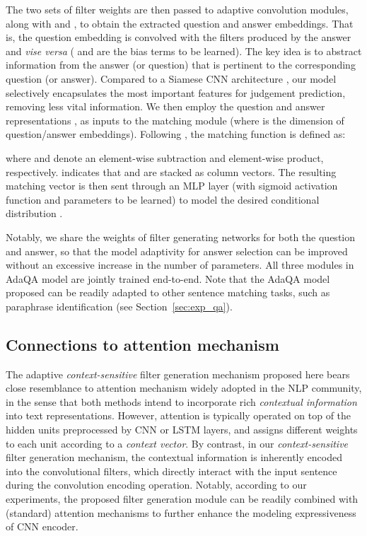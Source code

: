 \documentclass[11pt,a4paper]{article}
\begin{document}
The two sets of filter weights are then passed to adaptive convolution modules, along with  and , to obtain the extracted question and answer embeddings.
That is, the question embedding is convolved with the filters produced by the answer and \emph{vise versa} ( and  are the bias terms to be learned). The key idea is to abstract information from the answer (or question) that is pertinent to the corresponding question (or answer). Compared to a Siamese CNN architecture \citep{bromley1994signature}, our model selectively encapsulates the most important features for judgement prediction, removing less vital information. We then employ the question and answer representations ,  as inputs to the matching module (where  is the dimension of question/answer embeddings).
Following \citet{mou2015natural}, the matching function is defined as:

where  and  denote an element-wise subtraction and element-wise product, respectively.  indicates that  and  are stacked as column vectors. The resulting matching vector  is then sent through an MLP layer (with sigmoid activation function and parameters  to be learned) to model the desired conditional distribution .


Notably, we share the weights of filter generating networks for both the question and answer, so that the model adaptivity for answer selection can be improved without an excessive increase in the number of parameters. All three modules in AdaQA model are jointly trained end-to-end. Note that the AdaQA model proposed can be readily adapted to other sentence matching tasks, such as paraphrase identification (see Section~\ref{sec:exp_qa}).

\subsection{Connections to attention mechanism}
\label{sec:att}
The adaptive \emph{context-sensitive} filter generation mechanism proposed here bears close resemblance to attention mechanism \cite{yin2015abcnn, bahdanau2014neural, xiong2016dynamic} widely adopted in the NLP community, in the sense that both methods intend to incorporate rich \emph{contextual information} into text representations. However, attention is typically operated on top of the hidden units preprocessed by CNN or LSTM layers, and assigns different weights to each unit according to a \emph{context vector}. By contrast, in our \emph{context-sensitive} filter generation mechanism, the contextual information is inherently encoded into the convolutional filters, which directly interact with the input sentence during the convolution encoding operation. 
Notably, according to our experiments, the proposed filter generation module can be readily combined with (standard) attention mechanisms to further enhance the modeling expressiveness of CNN encoder.
\end{document}
